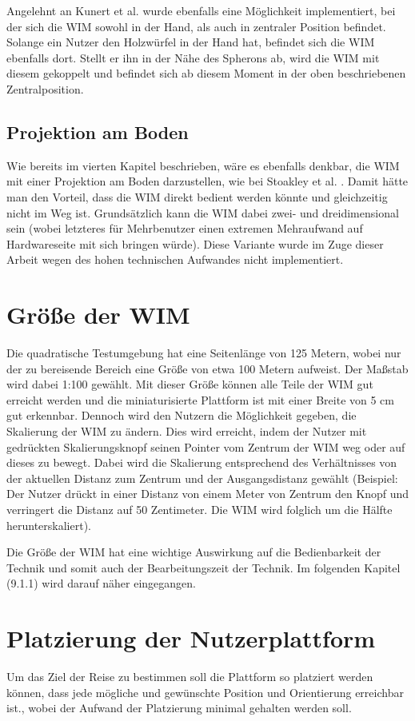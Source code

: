 Angelehnt an Kunert et al. \cite{Kunert2014Photoportals} wurde ebenfalls eine Möglichkeit implementiert, bei der sich die WIM sowohl in der Hand, als auch in zentraler Position befindet. Solange ein Nutzer den Holzwürfel in der Hand hat, befindet sich die WIM ebenfalls dort. Stellt er ihn in der Nähe des Spherons ab, wird die WIM mit diesem gekoppelt und befindet sich ab diesem Moment in der oben beschriebenen Zentralposition.

\subsection{Projektion am Boden}
Wie bereits im vierten Kapitel beschrieben, wäre es ebenfalls denkbar, die WIM mit einer Projektion am Boden darzustellen, wie bei Stoakley et al. \cite{Stoakley2010VirtualWIM}.
Damit hätte man den Vorteil, dass die WIM direkt bedient werden könnte und gleichzeitig nicht im Weg ist. Grundsätzlich kann die WIM dabei zwei- und dreidimensional sein (wobei letzteres für Mehrbenutzer einen extremen Mehraufwand auf Hardwareseite mit sich bringen würde). Diese Variante wurde im Zuge dieser Arbeit wegen des hohen technischen Aufwandes nicht implementiert.

\section{Größe der WIM}
Die quadratische Testumgebung hat eine Seitenlänge von 125 Metern, wobei nur der zu bereisende Bereich eine Größe von etwa 100 Metern aufweist.
Der Maßstab wird dabei 1:100 gewählt. Mit dieser Größe können alle Teile der WIM gut erreicht werden und die miniaturisierte Plattform ist mit einer Breite von 5 cm gut erkennbar. 
Dennoch wird den Nutzern die Möglichkeit gegeben, die Skalierung der WIM zu ändern. Dies wird erreicht, indem der Nutzer mit gedrückten Skalierungsknopf seinen Pointer vom Zentrum der WIM weg oder auf dieses zu bewegt. Dabei wird die Skalierung entsprechend des Verhältnisses von der aktuellen Distanz zum Zentrum und der Ausgangsdistanz gewählt (Beispiel: Der Nutzer drückt in einer Distanz von einem Meter von Zentrum den Knopf und verringert die Distanz auf 50 Zentimeter. Die WIM wird folglich um die Hälfte herunterskaliert).

Die Größe der WIM hat eine wichtige Auswirkung auf die Bedienbarkeit der Technik und somit auch der Bearbeitungszeit der Technik. Im folgenden Kapitel (9.1.1) wird darauf näher eingegangen.

\section{Platzierung der Nutzerplattform}
Um das Ziel der Reise zu bestimmen soll die Plattform so platziert werden können, dass jede mögliche und gewünschte Position und Orientierung erreichbar ist., wobei der Aufwand der Platzierung minimal gehalten werden soll.

